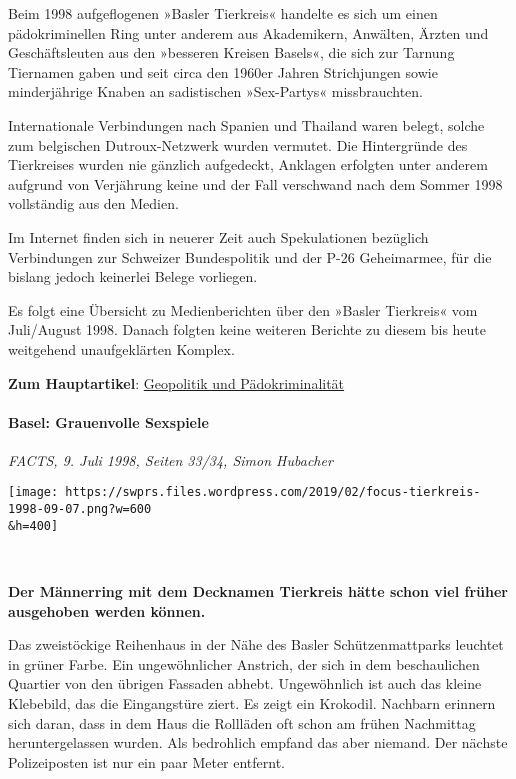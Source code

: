 Beim 1998 aufgeflogenen »Basler Tierkreis« handelte es sich um einen
pädokriminellen Ring unter anderem aus Akademikern, Anwälten, Ärzten und
Geschäftsleuten aus den »besseren Kreisen Basels«, die sich zur Tarnung
Tiernamen gaben und seit circa den 1960er Jahren Strichjungen sowie
minderjährige Knaben an sadistischen »Sex-Partys« missbrauchten.

Internationale Verbindungen nach Spanien und Thailand waren belegt,
solche zum belgischen Dutroux-Netzwerk wurden vermutet. Die Hintergründe
des Tierkreises wurden nie gänzlich aufgedeckt, Anklagen erfolgten unter
anderem aufgrund von Verjährung keine und der Fall verschwand nach dem
Sommer 1998 vollständig aus den Medien.

Im Internet finden sich in neuerer Zeit auch Spekulationen bezüglich
Verbindungen zur Schweizer Bundespolitik und der P-26 Geheimarmee, für
die bislang jedoch keinerlei Belege vorliegen.

Es folgt eine Übersicht zu Medienberichten über den »Basler Tierkreis«
vom Juli/August 1998. Danach folgten keine weiteren Berichte zu diesem
bis heute weitgehend unaufgeklärten Komplex.

\textbf{Zum Hauptartikel}:
\href{https://swprs.org/geopolitik-und-paedokriminalitaet/}{Geopolitik
und Pädokriminalität}

\hypertarget{basel-grauenvolle-sexspiele}{%
\paragraph{Basel: Grauenvolle
Sexspiele}\label{basel-grauenvolle-sexspiele}}

\emph{FACTS, 9. Juli 1998, Seiten 33/34, Simon Hubacher}

\texttt{[image: https://swprs.files.wordpress.com/2019/02/focus-tierkreis-1998-09-07.png?w=600\\\&h=400]}

~

\textbf{Der Männerring mit dem Decknamen Tierkreis hätte schon viel
früher ausgehoben werden können.}

Das zweistöckige Reihenhaus in der Nähe des Basler Schützenmattparks
leuchtet in grüner Farbe. Ein ungewöhnlicher Anstrich, der sich in dem
beschaulichen Quartier von den übrigen Fassaden abhebt. Ungewöhnlich ist
auch das kleine Klebebild, das die Eingangstüre ziert. Es zeigt ein
Krokodil. Nachbarn erinnern sich daran, dass in dem Haus die Rollläden
oft schon am frühen Nachmittag heruntergelassen wurden. Als bedrohlich
empfand das aber niemand. Der nächste Polizeiposten ist nur ein paar
Meter entfernt.

